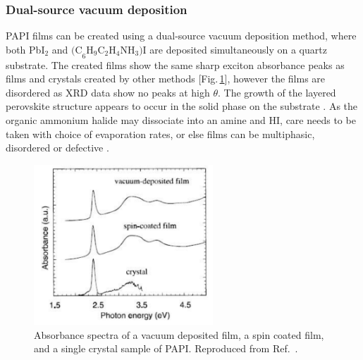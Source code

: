 \subsubsection{Dual-source vacuum deposition}
PAPI films can be created using a dual-source vacuum deposition method, where both Pb$\textrm{I}_2$ and $\textrm{(C}_6\textrm{H}_9\textrm{C}_2\textrm{H}_4\textrm{NH}_3)\textrm{I}$ are deposited simultaneously on a quartz substrate. The created films show the same sharp exciton absorbance peaks as films and crystals created by other methods [Fig.\,\ref{2Fig8}], however the films are disordered as XRD data show no peaks at high $\theta$. The growth of the layered perovskite structure appears to occur in the solid phase on the substrate \cite{Era1997}. As the organic ammonium halide may dissociate into an amine and HI, care needs to be taken with choice of evaporation rates, or else films can be multiphasic, disordered or defective \cite{Mitzi1999}.
\begin{figure}[h!]
\centering
\includegraphics[width=0.6\textwidth]{Fig8}
\caption{Absorbance spectra of a vacuum deposited film, a spin coated film, and a single crystal sample of PAPI. Reproduced from Ref.\ \cite{Era1997}.}
\label{2Fig8}
\end{figure}

